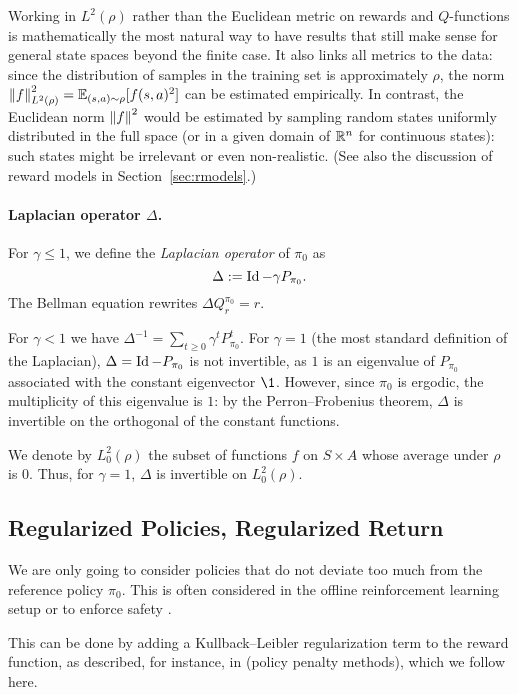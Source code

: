 \documentclass[11pt,a4paper]{article}
\begin{document}
Working in $L^2(\rho)$ rather than the Euclidean metric on rewards and
$Q$-functions is mathematically the most natural way to have results that
still make sense for general state spaces beyond the finite case. It also
links all metrics to the data: since the distribution of samples in the
training set is approximately $\rho$, the norm
$\left\lVert f\right\rVert^2_{L^2(\rho)}=\mathbb{E}_{(s,a)\sim \rho} [f(s,a)^2]$ can be estimated
empirically. In contrast, the Euclidean norm $\left\lVert f\right\rVert^2$ would be
estimated by sampling random states uniformly distributed in the full
space (or in a given domain of ${\mathbb{R}}^n$ for continuous states): such states
might be irrelevant or even non-realistic. (See also the discussion of
reward models in Section~\ref{sec:rmodels}.)

\paragraph{Laplacian operator $\Delta$.}
For $\gamma\leq 1$, we define the \emph{Laplacian operator} of $\pi_0$ as
\begin{equation}
\Delta\mathrel{\mathop{:}}= \operatorname{Id}-\gamma P_{\pi_0}.
\end{equation}
The Bellman equation rewrites $\Delta Q^{\pi_0}_r=r$.

For $\gamma<1$ we have $\Delta^{-1}=\sum_{t\geq 0}\gamma^t P_{\pi_0}^t$.
For $\gamma=1$ (the most standard definition of the Laplacian), $\Delta=\operatorname{Id}-P_{\pi_0}$ is not invertible, as $1$ is an eigenvalue of
$P_{\pi_0}$ associated with the constant eigenvector $\1$. However, since
$\pi_0$ is ergodic, the multiplicity of this eigenvalue is $1$: by the
Perron--Frobenius theorem, $\Delta$ is invertible on the orthogonal of
the constant functions.

We denote by $L^2_0(\rho)$ the subset of functions $f$ on $S\times A$
whose average under $\rho$ is $0$. Thus, for $\gamma=1$, $\Delta$ is
invertible on $L^2_0(\rho)$.

\subsection{Regularized Policies, Regularized Return}

We are only going to consider policies
that do not deviate too much from the reference policy $\pi_0$. This is
often considered in the offline reinforcement learning setup or to
enforce safety \cite{levine2020offline}.

This can be done by adding a Kullback--Leibler
regularization term to the reward function, as described, for instance,
in \cite[\S 4.3]{levine2020offline} (policy penalty methods), which we
follow here.
\end{document}

